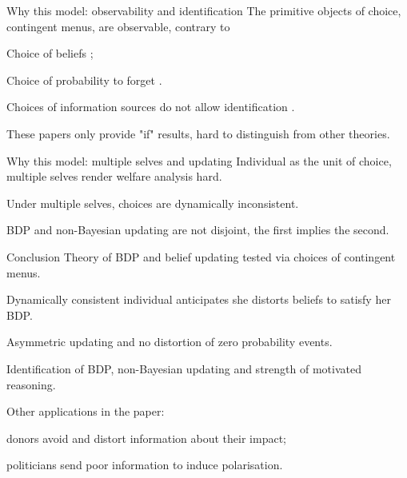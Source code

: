 \documentclass[usenames,dvipsnames,aspectratio=169,11pt, envcountsect, handout]{beamer}
\begin{document}
\begin{frame}{Why this model: observability and identification}
	The primitive objects of choice, contingent menus, are observable, contrary to

	\vfill

	\begin{wideitemize}
		\item Choice of beliefs \citep{brunnermeierOptimalExpectations2005,koszegiUtilityAnticipationPersonal2010};
		\item Choice of probability to forget \citep{benabou2016mindful}.
	\end{wideitemize}

	\vfill

	Choices of information sources do not allow identification \citep{eliazCanAnticipatoryFeelings2006}.

	\vfill

	These papers only provide "if" results, hard to distinguish from other theories.
\end{frame}

\begin{frame}{Why this model: multiple selves and updating}
	Individual as the unit of choice, multiple selves render welfare analysis hard.

	\vfill

	Under multiple selves, choices are dynamically inconsistent.

	\vfill

	BDP and non-Bayesian updating are not disjoint, the first implies the second.
\end{frame}


\begin{frame}{Conclusion}
	Theory of BDP and belief updating tested via choices of contingent menus.

	\vfill

	Dynamically consistent individual anticipates she distorts beliefs to satisfy her BDP.

	\vfill

	Asymmetric updating and no distortion of zero probability events.

	\vfill

	Identification of BDP, non-Bayesian updating and strength of motivated reasoning.

	\vfill

	Other applications in the paper:

	\vfill

	\begin{wideitemize}
		\item donors avoid and distort information about their impact;
		\item politicians send poor information to induce polarisation.
	\end{wideitemize}

\end{frame}
\end{document}
